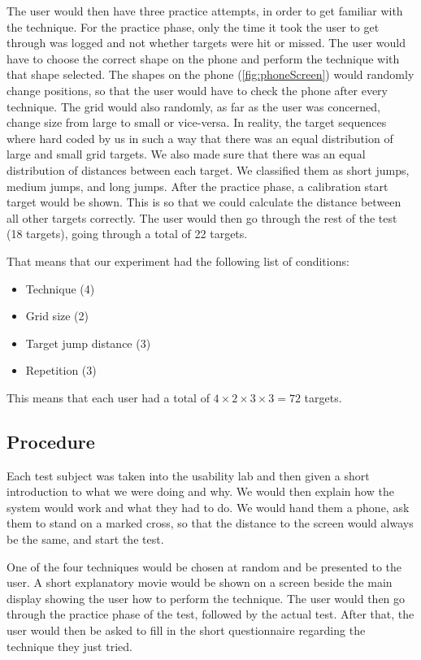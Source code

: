 The user would then have three practice attempts, in order to get familiar with the technique. 
For the practice phase, only the time it took the user to get through was logged and not whether targets were hit or missed. 
The user would have to choose the correct shape on the phone and perform the technique with that shape selected. 
The shapes on the phone (\cref{fig:phoneScreen}) would randomly change positions, so that the user would have to check the phone after every technique. 
The grid would also randomly, as far as the user was concerned, change size from large to small or vice-versa. In reality, the target sequences where hard coded by us in such a way that there was an equal distribution of large and small grid targets. We also made sure that there was an equal distribution of distances between each target. We classified them as short jumps, medium jumps, and long jumps. 
After the practice phase, a calibration start target would be shown. This is so that we could calculate the distance between all other targets correctly. The user would then go through the rest of the test (18 targets), going through a total of 22 targets. 

That means that our experiment had the following list of conditions:
\begin{itemize}
	 \item Technique (4)
	 \item Grid size (2)
	 \item Target jump distance (3)
	 \item Repetition (3)
\end{itemize}

This means that each user had a total of $4 \times 2 \times 3 \times 3 = 72 $ targets.

\subsection{Procedure}

Each test subject was taken into the usability lab and then given a short introduction to what we were doing and why. 
We would then explain how the system would work and what they had to do. 
We would hand them a phone, ask them to stand on a marked cross, so that the distance to the screen would always be the same, and start the test.

One of the four techniques would be chosen at random and be presented to the user. 
A short explanatory movie would be shown on a screen beside the main display showing the user how to perform the technique. 
The user would then go through the practice phase of the test, followed by the actual test. 
After that, the user would then be asked to fill in the short questionnaire regarding the technique they just tried. 

